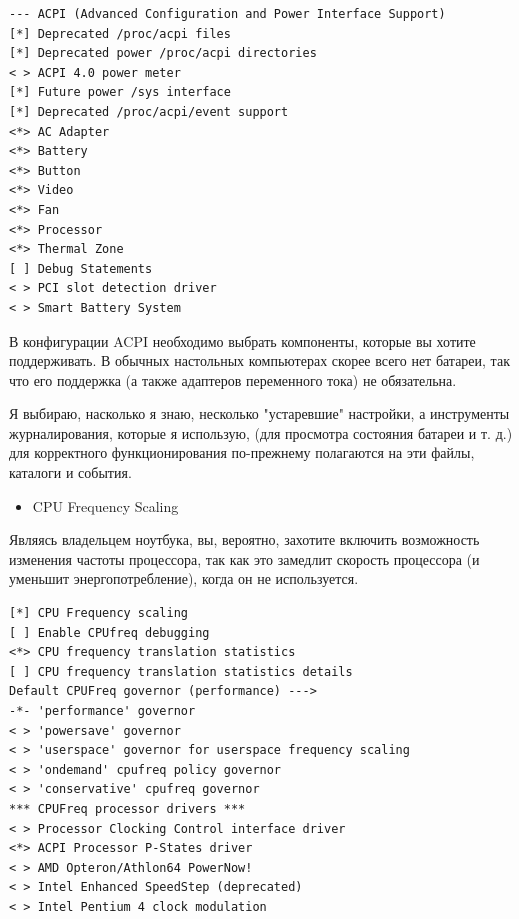 \documentclass[10pt]{book}
\begin{document}
\vspace{3mm}
\begin{tcolorbox}[colback=gray!14!white, colframe=blue!75!blue]
\begin{lstlisting}
--- ACPI (Advanced Configuration and Power Interface Support)
[*] Deprecated /proc/acpi files
[*] Deprecated power /proc/acpi directories
< > ACPI 4.0 power meter
[*] Future power /sys interface
[*] Deprecated /proc/acpi/event support
<*> AC Adapter
<*> Battery
<*> Button
<*> Video
<*> Fan
<*> Processor
<*> Thermal Zone
[ ] Debug Statements
< > PCI slot detection driver
< > Smart Battery System
\end{lstlisting}
\end{tcolorbox}

В конфигурации ACPI необходимо выбрать компоненты, которые вы хотите поддерживать. В обычных настольных компьютерах  скорее всего нет батареи, так что его поддержка (а также адаптеров переменного тока) не обязательна. 

Я выбираю, насколько я знаю, несколько "устаревшие" настройки, а инструменты журналирования, которые я использую, (для просмотра состояния батареи и т. д.) для корректного функционирования по-прежнему полагаются на эти файлы, каталоги и события.

\begin{itemize}
\item CPU Frequency Scaling                       
\end{itemize}

Являясь владельцем ноутбука, вы, вероятно, захотите включить возможность изменения частоты процессора, так как это замедлит скорость
процессора (и уменьшит энергопотребление), когда он не используется.

\vspace{3mm}
\begin{tcolorbox}[colback=gray!14!white, colframe=blue!75!blue]
\begin{lstlisting}
[*] CPU Frequency scaling
[ ] Enable CPUfreq debugging
<*> CPU frequency translation statistics
[ ] CPU frequency translation statistics details
Default CPUFreq governor (performance) --->
-*- 'performance' governor
< > 'powersave' governor
< > 'userspace' governor for userspace frequency scaling
< > 'ondemand' cpufreq policy governor
< > 'conservative' cpufreq governor
*** CPUFreq processor drivers ***
< > Processor Clocking Control interface driver
<*> ACPI Processor P-States driver
< > AMD Opteron/Athlon64 PowerNow!
< > Intel Enhanced SpeedStep (deprecated)
< > Intel Pentium 4 clock modulation
\end{lstlisting}
\end{tcolorbox}
\end{document}
